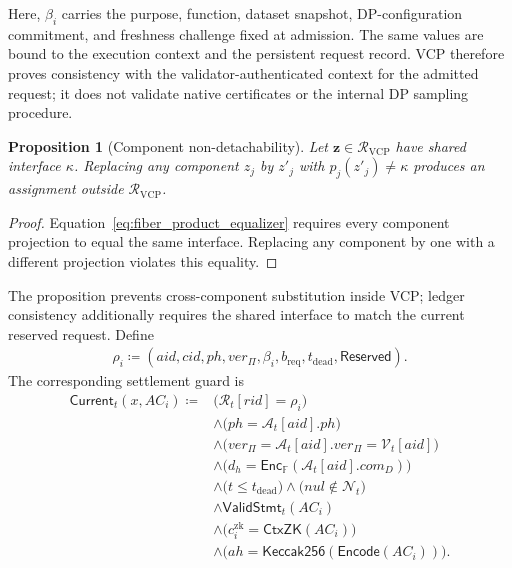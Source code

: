 \documentclass[10pt,journal,compsoc]{IEEEtran}
\newtheorem{proposition}{Proposition}
\begin{document}
Here, $\beta_i$ carries the purpose, function, dataset snapshot, DP-configuration commitment, and freshness challenge fixed at admission. The same values are bound to the execution context and the persistent request record. VCP therefore proves consistency with the validator-authenticated context for the admitted request; it does not validate native certificates or the internal DP sampling procedure.

\begin{proposition}[Component non-detachability]
\label{prop:fiber_product_non_detachability}
Let $\mathbf{z}\in\mathcal{R}_{\mathrm{VCP}}$ have shared interface $\kappa$. Replacing any component $z_j$ by $z'_j$ with $p_j(z'_j)\neq\kappa$ produces an assignment outside $\mathcal{R}_{\mathrm{VCP}}$.
\end{proposition}

\begin{proof}
Equation~\eqref{eq:fiber_product_equalizer} requires every component projection to equal the same interface. Replacing any component by one with a different projection violates this equality.
\end{proof}

The proposition prevents cross-component substitution inside VCP; ledger consistency additionally requires the shared interface to match the current reserved request. Define
\begin{equation}
\begin{aligned}
\rho_i\coloneqq
(aid,cid,ph,ver_{\Pi},\beta_i,
b_{\mathrm{req}},t_{\mathrm{dead}},\mathsf{Reserved}).
\end{aligned}
\end{equation}
The corresponding settlement guard is
\begin{equation}
\begin{aligned}
\mathsf{Current}_t(x,AC_i)\coloneqq{}&
\bigl(\mathcal{R}_t[rid]=\rho_i\bigr)\\
&\land\bigl(ph=\mathcal{A}_t[aid].ph\bigr)\\
&\land\bigl(
ver_{\Pi}
=\mathcal{A}_t[aid].ver_{\Pi}
=\mathcal{V}_t[aid]
\bigr)\\
&\land\bigl(
d_h=\mathsf{Enc}_{\mathbb{F}}
(\mathcal{A}_t[aid].com_D)
\bigr)\\
&\land\bigl(t\leq t_{\mathrm{dead}}\bigr)
\land\bigl(nul\notin\mathcal{N}_t\bigr)\\
&\land\mathsf{ValidStmt}_t(AC_i)\\
&\land\bigl(
c_i^{\mathrm{zk}}
=\mathsf{CtxZK}(AC_i)
\bigr)\\
&\land\bigl(
ah=\mathsf{Keccak256}
(\mathsf{Encode}(AC_i))
\bigr).
\end{aligned}
\label{eq:current_state_predicate}
\end{equation}
\end{document}
